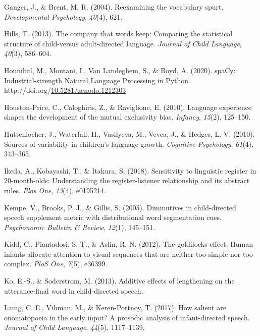 \documentclass[10pt, letterpaper]{article}
\newenvironment{CSLReferences}%
  {}%
  {\par}
\begin{document}
\begin{CSLReferences}{1}{0}
\leavevmode\hypertarget{ref-ganger2004reexamining}{}%
Ganger, J., \& Brent, M. R. (2004). Reexamining the vocabulary spurt.
\emph{Developmental Psychology}, \emph{40}(4), 621.

\leavevmode\hypertarget{ref-hills2013company}{}%
Hills, T. (2013). The company that words keep: Comparing the statistical
structure of child-versus adult-directed language. \emph{Journal of
Child Language}, \emph{40}(3), 586--604.

\leavevmode\hypertarget{ref-honnibal2020spacy}{}%
Honnibal, M., Montani, I., Van Landeghem, S., \& Boyd, A. (2020).
{spaCy: Industrial-strength Natural Language Processing in Python}.
http://doi.org/\href{https://doi.org/10.5281/zenodo.1212303}{10.5281/zenodo.1212303}

\leavevmode\hypertarget{ref-houston2010language}{}%
Houston-Price, C., Caloghiris, Z., \& Raviglione, E. (2010). Language
experience shapes the development of the mutual exclusivity bias.
\emph{Infancy}, \emph{15}(2), 125--150.

\leavevmode\hypertarget{ref-huttenlocher2010sources}{}%
Huttenlocher, J., Waterfall, H., Vasilyeva, M., Vevea, J., \& Hedges, L.
V. (2010). Sources of variability in children's language growth.
\emph{Cognitive Psychology}, \emph{61}(4), 343--365.

\leavevmode\hypertarget{ref-ikeda2018sensitivity}{}%
Ikeda, A., Kobayashi, T., \& Itakura, S. (2018). Sensitivity to
linguistic register in 20-month-olds: Understanding the
register-listener relationship and its abstract rules. \emph{Plos One},
\emph{13}(4), e0195214.

\leavevmode\hypertarget{ref-kempe2005diminutives}{}%
Kempe, V., Brooks, P. J., \& Gillis, S. (2005). Diminutives in
child-directed speech supplement metric with distributional word
segmentation cues. \emph{Psychonomic Bulletin \& Review}, \emph{12}(1),
145--151.

\leavevmode\hypertarget{ref-kidd2012goldilocks}{}%
Kidd, C., Piantadosi, S. T., \& Aslin, R. N. (2012). The goldilocks
effect: Human infants allocate attention to visual sequences that are
neither too simple nor too complex. \emph{PloS One}, \emph{7}(5),
e36399.

\leavevmode\hypertarget{ref-ko2013additive}{}%
Ko, E.-S., \& Soderstrom, M. (2013). Additive effects of lengthening on
the utterance-final word in child-directed speech.

\leavevmode\hypertarget{ref-laing2017salient}{}%
Laing, C. E., Vihman, M., \& Keren-Portnoy, T. (2017). How salient are
onomatopoeia in the early input? A prosodic analysis of infant-directed
speech. \emph{Journal of Child Language}, \emph{44}(5), 1117--1139.


\end{CSLReferences}
\end{document}
